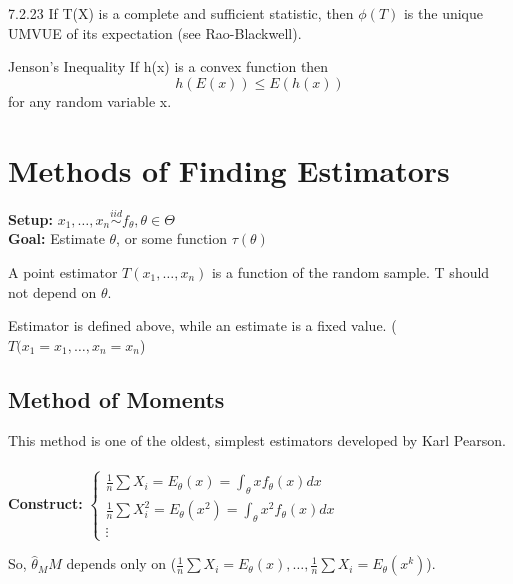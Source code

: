 \documentclass[11pt,fleqn]{book} %
\begin{document}
 \begin{theorem}{7.2.23}
 	If T(X) is a complete and sufficient statistic, then $\phi(T)$ is the unique UMVUE of its expectation (see Rao-Blackwell).
 \end{theorem}

 \begin{definition}{Jenson's Inequality}
 If h(x) is a convex function then 
 $$h(E(x))\le E(h(x)) $$
for any random variable x.  	
 \end{definition}

 \section{Methods of Finding Estimators}

 \textbf{Setup:} $x_1, \dots, x_n \overset{iid}{\sim} f_\theta, \theta \in \Theta$  \\
 \textbf{Goal:} Estimate $\theta$, or some function $\tau(\theta)$\\

 \begin{definition}
 	A point estimator $T(x_1, \dots, x_n)$ is a function of the random sample. T should not depend on $\theta$. 
 \end{definition}

 \begin{remark}
 	Estimator is defined above, while an estimate is a fixed value. ($T(x_1 = x_1, \dots, x_n = x_n$)
 \end{remark}

 \subsection{Method of Moments}

This method is one of the oldest, simplest estimators developed by Karl Pearson.\\ 
\\
\textbf{Construct:} $\begin{cases}
               \frac{1}{n} \sum X_i = E_\theta(x) = \int_\theta x f_\theta(x) dx\\
               \frac{1}{n} \sum X_i^2 = E_\theta(x^2) = \int_\theta x^2 f_\theta(x) dx\\
               \vdots
            \end{cases}$

So, $\hat{\theta}_MM$ depends only on ($\frac{1}{n} \sum X_i = E_\theta(x), \dots, \frac{1}{n} \sum X_i = E_\theta(x^k)$).
\end{document}
